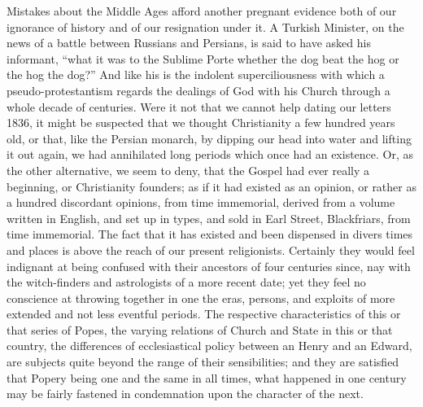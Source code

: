 Mistakes about the Middle Ages afford another
pregnant evidence both of our ignorance of history and of our
resignation under it. A Turkish Minister, on the news of a battle
between Russians and Persians, is said to have asked his informant, ``what
it was to the Sublime Porte whether the dog beat the hog or the hog the
dog?'' And like his is the indolent superciliousness with which a pseudo-protestantism
regards the dealings of God with his Church through a whole decade of
centuries. Were it not that we cannot help dating our letters 1836, it
might be suspected that we thought Christianity a few hundred years old,
or that, like the Persian monarch, by dipping our head into water and
lifting it out again, we had annihilated long periods which once had an
existence. Or, as the other alternative, we seem to deny, that the
Gospel had ever really a beginning, or Christianity founders; as if it
had existed as an opinion, or rather as a hundred discordant opinions,
from time immemorial, derived from a volume written in English, and set
up in types, and sold in Earl Street, Blackfriars, from time immemorial.
The fact that it has existed and been dispensed in divers times and
places is above the reach of our present religionists. Certainly they
would feel indignant at being confused with their ancestors of four
centuries since, nay with the witch-finders and astrologists of a more
recent date; yet they feel no conscience at throwing together in one the
eras, persons, and exploits of more extended and not less eventful
periods. The respective characteristics of this or that series of Popes,
the varying relations of Church and State in this or that country, the
differences of ecclesiastical policy between an Henry and an Edward, are
subjects quite beyond the range of their sensibilities; and they are
satisfied that Popery being one and the same in all times, what happened
in one century may be fairly fastened in condemnation upon the character
of the next.

